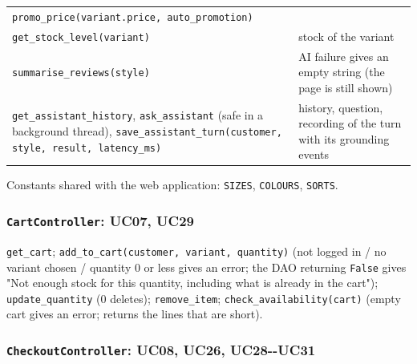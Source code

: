 {\begin{longtable}{@{}
  >{\raggedright\arraybackslash}p{}
  >{\raggedright\arraybackslash}p{}@{}}
\texttt{promo\_\allowbreak{}price(\allowbreak{}variant.\allowbreak{}price,\allowbreak{} auto\_\allowbreak{}promotion)} \\
\texttt{get\_\allowbreak{}stock\_\allowbreak{}level(\allowbreak{}variant)} & stock of the variant \\
\texttt{summarise\_\allowbreak{}reviews(\allowbreak{}style)} & AI failure gives an empty string
(the page is still shown) \\
\texttt{get\_\allowbreak{}assistant\_\allowbreak{}history}, \texttt{ask\_\allowbreak{}assistant} (safe in a
background thread),
\texttt{save\_\allowbreak{}assistant\_\allowbreak{}turn(\allowbreak{}customer,\allowbreak{} style,\allowbreak{} result,\allowbreak{} latency\_\allowbreak{}ms)}
& history, question, recording of the turn with its grounding events \\
\end{longtable}}

Constants shared with the web application: \texttt{SIZES},
\texttt{COLOURS}, \texttt{SORTS}.

\hypertarget{cartcontroller-uc07-uc29}{%
\subsubsection{\texorpdfstring{\texttt{CartController}: UC07,
UC29}{CartController: UC07, UC29}}\label{cartcontroller-uc07-uc29}}

\texttt{get\_\allowbreak{}cart};
\texttt{add\_\allowbreak{}to\_\allowbreak{}cart(\allowbreak{}customer,\allowbreak{} variant,\allowbreak{} quantity)} (not logged in /
no variant chosen / quantity 0 or less gives an error; the DAO returning
\texttt{False} gives "Not enough stock for this quantity, including what
is already in the cart"); \texttt{update\_\allowbreak{}quantity} (0 deletes);
\texttt{remove\_\allowbreak{}item}; \texttt{check\_\allowbreak{}availability(\allowbreak{}cart)} (empty cart
gives an error; returns the lines that are short).

\hypertarget{checkoutcontroller-uc08-uc26-uc28--uc31}{%
\subsubsection{\texorpdfstring{\texttt{CheckoutController}: UC08, UC26,
UC28-\/-UC31}{CheckoutController: UC08, UC26, UC28-\/-UC31}}\label{checkoutcontroller-uc08-uc26-uc28--uc31}}

